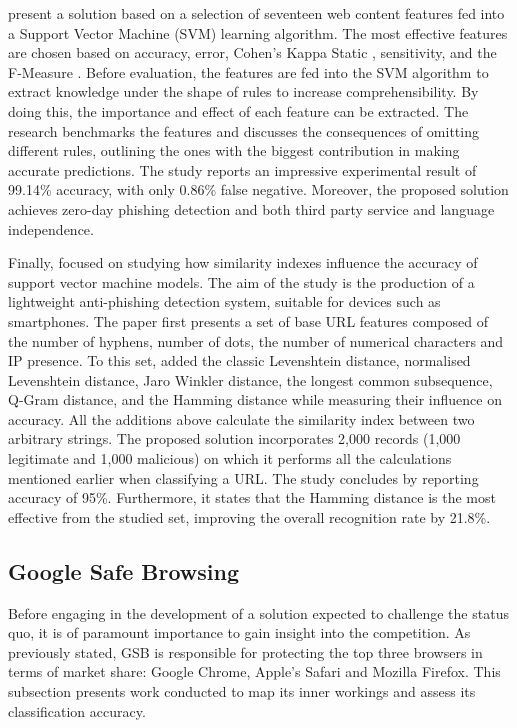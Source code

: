 \cite{Mahmood_Moghimi} present a solution based on a selection of seventeen web content features fed into a Support Vector Machine (SVM) learning algorithm. The most effective features are chosen based on accuracy, error, Cohen's Kappa Static \citep{Ian_Witten}, sensitivity, and the F-Measure \citep{Ian_Witten}. Before evaluation, the features are fed into the SVM algorithm to extract knowledge under the shape of rules to increase comprehensibility. By doing this, the importance and effect of each feature can be extracted. The research benchmarks the features and discusses the consequences of omitting different rules, outlining the ones with the biggest contribution in making accurate predictions. The study reports an impressive experimental result of 99.14\% accuracy, with only 0.86\% false negative. Moreover, the proposed solution achieves zero-day phishing detection and both third party service and language independence.

Finally, \cite{Mouad_Zouina} focused on studying how similarity indexes influence the accuracy of support vector machine models. The aim of the study is the production of a lightweight anti-phishing detection system, suitable for devices such as smartphones. The paper first presents a set of base URL features composed of the number of hyphens, number of dots, the number of numerical characters and IP presence. To this set, \cite{Mouad_Zouina} added the classic Levenshtein distance, normalised Levenshtein distance, Jaro Winkler distance, the longest common subsequence, Q-Gram distance, and the Hamming distance while measuring their influence on accuracy. All the additions above calculate the similarity index between two arbitrary strings. The proposed solution incorporates 2,000 records (1,000 legitimate and 1,000 malicious) on which it performs all the calculations mentioned earlier when classifying a URL. The study concludes by reporting accuracy of 95\%. Furthermore, it states that the Hamming distance is the most effective from the studied set, improving the overall recognition rate by 21.8\%.


\subsection{Google Safe Browsing}
\label{subsec:google_safe_browsing}
Before engaging in the development of a solution expected to challenge the status quo, it is of paramount importance to gain insight into the competition. As previously stated, GSB is responsible for protecting the top three browsers in terms of market share: Google Chrome, Apple's Safari and Mozilla Firefox. This subsection presents work conducted to map its inner workings and assess its classification accuracy.

